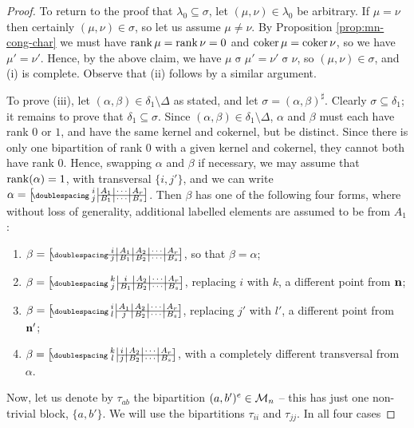 \begin{lemma}
\begin{proof}
    To return to the proof that $\lambda_0 \subseteq \sigma$, let
    $(\mu, \nu) \in \lambda_0$ be arbitrary.  If $\mu = \nu$ then certainly
    $(\mu, \nu) \in \sigma$, so let us assume $\mu \neq \nu$.  By Proposition
    \ref{prop:mn-cong-char} we must have $\operatorname{rank}\mu = \operatorname{rank}\nu = 0$ and
    $\operatorname{coker}\mu = \operatorname{coker}\nu$, so we have $\mu' = \nu'$.  Hence, by the above
    claim, we have $\mu \mathrel\sigma \mu' = \nu' \mathrel\sigma \nu$,
    so $(\mu, \nu) \in \sigma$, and (i) is complete.  Observe that (ii) follows
    by a similar argument.

    To prove (iii), let $(\alpha,\beta)\in\delta_1\setminus\Delta$ as stated,
    and let $\sigma = (\alpha,\beta)^\sharp$.  Clearly
    $\sigma \subseteq \delta_1$; it remains to prove that
    $\delta_1 \subseteq \sigma$.  Since
    $(\alpha,\beta) \in \delta_1 \setminus \Delta$, $\alpha$ and $\beta$ must
    each have rank $0$ or $1$, and have the same kernel and
    cokernel, but be distinct.  Since there is only one bipartition of rank $0$
    with a given kernel and cokernel, they cannot both have rank $0$.  Hence,
    swapping $\alpha$ and $\beta$ if necessary, we may assume that
    $\operatorname{rank}(\alpha)=1$, with transversal $\{i,j'\}$, and we can write
    $\alpha=\bipart{c|c|c|c}{2-4}
    {i & A_1 & \cdots & A_r}{j & B_1 & \cdots & B_s}$.
    Then $\beta$ has one of the following four forms, where without loss of
    generality, additional labelled elements are assumed to be from $A_1$:
    \begin{enumerate}[\rm(a)]
    \item $\beta = \bipart{c|c|c|c|c}{1-5}
      {i & A_1 & A_2 & \cdots & A_r}{j & B_1 & B_2 & \cdots & B_s}$,
      so that $\beta = \widehat\alpha$;
    \item $\beta = \bipart{c|c|c|c|c}{2-5}
      {k & i & A_2 & \cdots & A_r}{j & B_1 & B_2 & \cdots & B_s}$,
      replacing $i$ with $k$, a different point from $\mathbf{n}$;
    \item $\beta = \bipart{c|c|c|c|c}{2-5}
      {i & A_1 & A_2 & \cdots & A_r}{l & j & B_2 & \cdots & B_s}$,
      replacing $j'$ with $l'$, a different point from $\mathbf{n}'$;
    \item $\beta = \bipart{c|c|c|c|c}{2-5}
      {k & i & A_2 & \cdots & A_r}{l & j & B_2 & \cdots & B_s}$,
      with a completely different transversal from $\alpha$.
    \end{enumerate}
    Now, let us denote by $\tau_{ab}$ the bipartition
    $(a, b')^e \in \mathcal{M}_n$ -- this has just one non-trivial block, $\{a,b'\}$.
    We will use the bipartitions $\tau_{ii}$ and $\tau_{jj}$. In all four cases

\end{proof}
\end{lemma}
